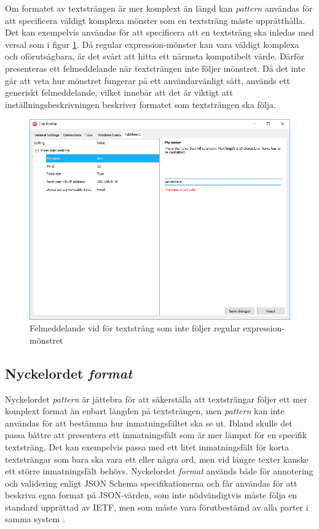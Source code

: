Om formatet av textsträngen är mer komplext än längd kan \textit{pattern} användas för att specificera väldigt komplexa mönster som en textsträng måste upprätthålla. Det kan exempelvis användas för att specificera att en textsträng ska inledas med versal som i figur \ref{fig:textstrang-pattern}. Då regular expression-mönster kan vara väldigt komplexa och oförutsägbara, är det svårt att hitta ett närmsta kompatibelt värde. Därför presenteras ett felmeddelande när textsträngen inte följer mönstret. Då det inte går att veta hur mönstret fungerar på ett användarvänligt sätt, används ett generiskt felmeddelande, vilket innebär att det är viktigt att inställningsbeskrivningen beskriver formatet som textsträngen ska följa.

\begin{figure}
	\includegraphics[width=\textwidth]{./images/gui/textstrang-pattern.png}
	\vspace{-1.7em}
	\caption{Felmeddelande vid för textsträng som inte följer regular expression-mönstret}
	\label{fig:textstrang-pattern}
\end{figure}

\FloatBarrier
\subsection{Nyckelordet \textit{format}}

Nyckelordet \textit{pattern} är jättebra för att säkerställa att textsträngar följer ett mer komplext format än enbart längden på textsträngen, men \textit{pattern} kan inte användas för att bestämma hur inmatningsfältet ska se ut. Ibland skulle det passa bättre att presentera ett inmatningsfält som är mer lämpat för en specifik textsträng. Det kan exempelvis passa med ett litet inmatningsfält för korta textsträngar som bara ska vara ett eller några ord, men vid längre texter kanske ett större inmatningsfält behövs. Nyckelordet \textit{format} används både för annotering och validering enligt JSON Schema specifikationerna och får användas för att beskriva egna format på JSON-värden, som inte nödvändigtvis måste följa en standard upprättad av IETF, men som måste vara förutbestämd av alla parter i samma system \cite[s.~17-18]{Andrews2018}.

